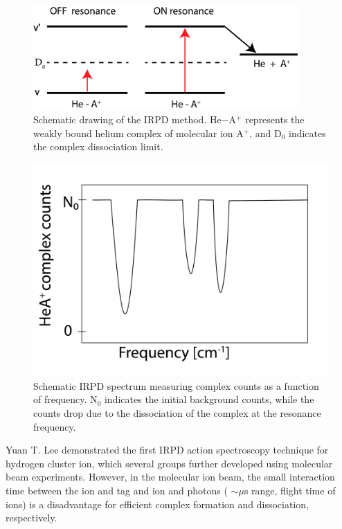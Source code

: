 \begin{figure}[!htb]
    \centering
    \includegraphics[width=0.9\textwidth]{figures/intro/IRPD.png}
    \caption{Schematic drawing of the IRPD method. He$-$A$^+$ represents the weakly bound helium complex of molecular ion A$^+$, and D$_0$ indicates the complex dissociation limit.}
    \label{fig:IRPD}
\end{figure}

\begin{figure}[!htb]
    \centering
    \includegraphics[scale=0.5]{figures/intro/IRPD_spectrum.png}
    \caption{Schematic IRPD spectrum measuring complex counts as a function of frequency. N$_0$ indicates the initial background counts, while the counts drop due to the dissociation of the complex at the resonance frequency.}
    \label{fig:IRPD_spectrum}
\end{figure}

Yuan T. Lee demonstrated the first  IRPD action spectroscopy technique  \cite{okumura_vibrational_1985} for hydrogen cluster ion, which several groups further developed \cite{bieske_spectroscopic_1993, duncan_infrared_2003, lisy_infrared_2006} using molecular beam experiments. However, in the molecular ion beam, the small interaction time between the ion and tag and ion and photons ( $\sim \mu$s range, flight time of ions) is a disadvantage for efficient complex formation and dissociation, respectively.

